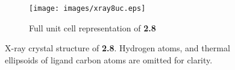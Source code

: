 \begin{figure}[!ht]
\begin{subfigure}[b]{0.49\textwidth}
 \end{subfigure}
 \begin{subfigure}[b]{\textwidth}
  \centering
  \texttt{[image: images/xray8uc.eps]}
  \caption{Full unit cell representation of \textbf{2.8}}
 \end{subfigure}
\caption[X-ray crystal structure of \textbf{2.8}]{X-ray crystal structure of \textbf{2.8}. Hydrogen atoms, and thermal ellipsoids of ligand carbon atoms are omitted for clarity.}
\label{fig.xray28}
\end{figure}